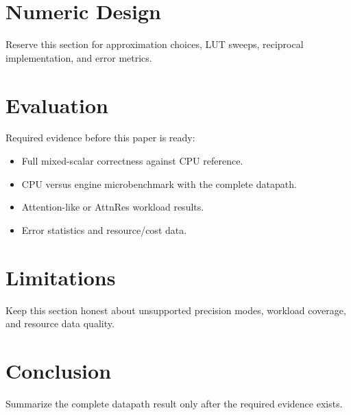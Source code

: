 \documentclass[conference]{IEEEtran}
\begin{document}
\section{Numeric Design}

Reserve this section for approximation choices, LUT sweeps, reciprocal
implementation, and error metrics.

\section{Evaluation}

Required evidence before this paper is ready:

\begin{itemize}
  \item Full mixed-scalar correctness against CPU reference.
  \item CPU versus engine microbenchmark with the complete datapath.
  \item Attention-like or AttnRes workload results.
  \item Error statistics and resource/cost data.
\end{itemize}

\section{Limitations}

Keep this section honest about unsupported precision modes, workload coverage,
and resource data quality.

\section{Conclusion}

Summarize the complete datapath result only after the required evidence exists.



\end{document}
